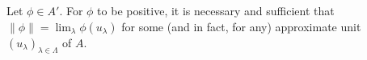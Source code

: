 Let $\phi \in A'$. For $\phi$ to be positive, it is necessary and sufficient that $\|\phi\| = \lim_{\lambda} \phi(u_{\lambda})$ for some (and in fact, for any) approximate unit $(u_{\lambda})_{\lambda \in \Lambda}$ of $A$.
